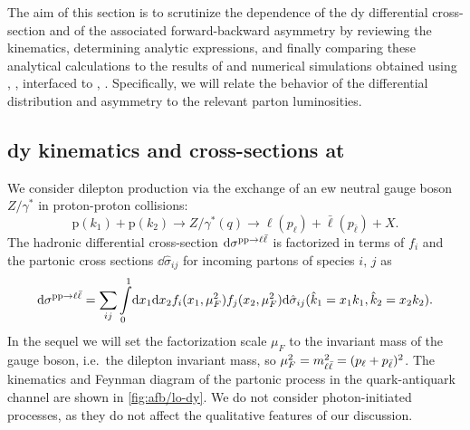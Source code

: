
The aim of this  section is to scrutinize the \pdf dependence of the \nc
\acrlong{dy} differential cross-section and of the associated forward-backward
asymmetry by reviewing the \lo kinematics, determining \lo analytic
expressions, and finally comparing these analytical calculations to the results
of \lo and \nlo  numerical simulations obtained using \mgamc,
\cite{Alwall:2014hca}, interfaced to \pineappl,
\cite{Carrazza:2020gss,christopher_schwan_2022_7023438}.
%
Specifically, we will relate the behavior of the differential distribution and
asymmetry to the relevant parton luminosities.

\subsection{\acrlong{dy} kinematics and cross-sections at \lo}
\label{sec:afb/dylo}

We consider dilepton production via the exchange of an \acrlong{ew} neutral
gauge boson $Z/\gamma^*$ in proton-proton collisions:
\begin{equation}
  \label{eq:afb/DYprocess}
  \mathrm{p}(k_1) + \mathrm{p}(k_2) \to Z/\gamma^*(q) \to \ell(p_{\ell}) + \bar{\ell}(p_{\bar{\ell}}) + X \text{.}
\end{equation}
The hadronic differential cross-section $\dd\sigma^{\mathrm{p}\mathrm{p}\to\ell\bar{\ell}}$  is factorized in
terms of \pdfs $f_i$ and the partonic cross sections
$\dd\hat\sigma_{ij}$ for incoming partons of species $i,\,j$ as
\begin{equation}
  \dd\sigma^{\mathrm{p}\mathrm{p}\to\ell\bar{\ell}} = \sum_{ij} \int\limits_0^1\!\dd x_1 \dd
  x_2 f_i(x_1,\mu_F^2) f_j(x_2,\mu_F^2) \dd\hat\sigma_{ij}(\hat k_1 = x_1
  k_1, \hat k_2 = x_2 k_2).
  \label{eq:afb/factorization}
\end{equation}
In the sequel we will set the  factorization scale $\mu_F$ to the
invariant mass of the gauge boson, i.e.\ the dilepton
invariant mass, so $\mu^2_F = m_{\ell\bar{\ell}}^2=(p_\ell + p_{\bar{\ell}})^2$.
%
The kinematics and Feynman diagram of the \lo partonic process
in the quark-antiquark channel are shown in \cref{fig:afb/lo-dy}.
We do not consider photon-initiated processes, as they do not affect
the qualitative features of our discussion.



